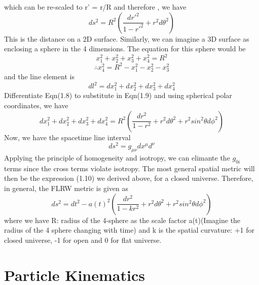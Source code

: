 \documentclass[12pt,a4paper,oneside]{book}
\begin{document}
which can be re-scaled to r' = r/R and therefore , we have 
\begin{equation}
    ds^2 = R^2(\frac{dr'^2}{1-r'^2} + r^2d\theta^2) 
\end{equation}
This is the distance on a 2D surface. Similarly, we can imagine a 3D surface as enclosing a sphere in the 4 dimensions. The equation for this sphere would be 
\begin{equation}
    x_{1}^2 +x_{2}^2+x_{3}^2 +x_{4}^2 = R^2
\end{equation}
\begin{equation}
   \therefore x_{4}^2 = R^2 - x_{1}^2-x_{2}^2 -x_{3}^2
\end{equation}
and the line element is 
\begin{equation}
    dl^2 = dx_{1}^2 +dx_{2}^2 + dx_{3}^2 + dx_{4}^2
\end{equation}
Differentiate Eqn(1.8) to substitute in Eqn(1.9) and using spherical polar coordinates, we have
\begin{equation}
    dx_{1}^2 +dx_{2}^2 + dx_{3}^2 + dx_{4}^2 = R^2(\frac{dr^2}{1-r^2}+r^2d\theta^2+r^2sin^2\theta d\phi^2)
\end{equation}
Now, we have the spacetime line interval 
\begin{equation}
    ds^2  = g_{\mu\nu}dx^{\mu}d^{\nu}
\end{equation}
Applying the principle of homogeneity and isotropy, we can elimante the $g_{0i}$ terms since the cross terms violate isotropy. The most general spatial metric will then be the expression (1.10) we derived above, for a closed universe. Therefore, in general, the FLRW metric is given as 
\begin{equation}
      ds^2 = dt^2 -a(t)^2(\frac{dr^2}{1-kr^2}+r^2d\theta^2+r^2sin^2\theta d\phi^2)
\end{equation}
where we have R: radius of the 4-sphere as the scale factor a(t)(Imagine the radius of the 4 sphere changing with time) and k is the spatial curvature: +1 for closed universe, -1 for open and 0 for flat universe. 
\section{Particle Kinematics}
\end{document}
